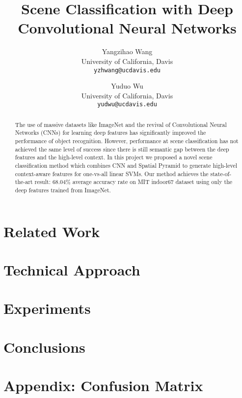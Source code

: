 \documentclass[10pt,twocolumn,letterpaper]{article}
\begin{document}
\title{Scene Classification with Deep Convolutional Neural Networks}

\author{Yangzihao Wang\\
University of California, Davis\\
{\tt\small yzhwang@ucdavis.edu}
\and
Yuduo Wu\\
University of California, Davis\\
{\tt\small yudwu@ucdavis.edu}
}

\maketitle

\begin{abstract}
The use of massive datasets like ImageNet and the revival of Convolutional
Neural Networks (CNNs) for learning deep features has significantly improved
the performance of object recognition. However, performance at scene
classification has not achieved the same level of success since there is still
semantic gap between the deep features and the high-level context.  In this
project we proposed a novel scene classification method which combines CNN and
Spatial Pyramid to generate high-level context-aware features for one-vs-all
linear SVMs. Our method achieves the state-of-the-art result: 68.04\% average
accuracy rate on MIT indoor67 dataset using only the deep features trained from
ImageNet.

\end{abstract}

\section{Related Work}
\label{sec:related}


\section{Technical Approach}
\label{sec:method}


\section{Experiments}
\label{sec:results}



\section{Conclusions}
\label{sec:conclusion}


{\small


}

\appendix
\section*{Appendix: Confusion Matrix}

\label{sec:appendix}

\end{document}
